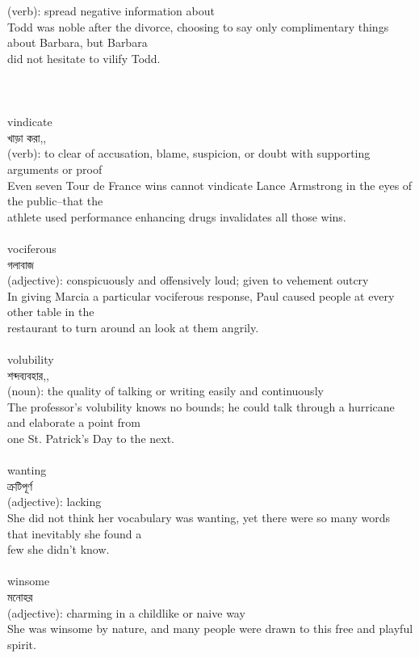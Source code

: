 \documentclass{article}
\begin{document}
{(verb): spread negative information about\\Todd was noble after the divorce, choosing to say only complimentary things about Barbara, but Barbara\\did not hesitate to vilify Todd.\\\\                                                                             \\}\\
{vindicate}\\
{খাড়া করা,,}\\
{(verb): to clear of accusation, blame, suspicion, or doubt with supporting arguments or proof\\Even seven Tour de France wins cannot vindicate Lance Armstrong in the eyes of the public--that the\\athlete used performance enhancing drugs invalidates all those wins.\\}\\
{vociferous}\\
{গলাবাজ}\\
{(adjective): conspicuously and offensively loud; given to vehement outcry\\In giving Marcia a particular vociferous response, Paul caused people at every other table in the\\restaurant to turn around an look at them angrily.\\}\\
{volubility}\\
{শব্দব্যবহার,,}\\
{(noun): the quality of talking or writing easily and continuously\\The professor's volubility knows no bounds; he could talk through a hurricane and elaborate a point from\\one St. Patrick's Day to the next.\\}\\
{wanting}\\
{ক্রটিপূর্ণ}\\
{(adjective): lacking\\She did not think her vocabulary was wanting, yet there were so many words that inevitably she found a\\few she didn't know.\\}\\
{winsome}\\
{মনোহর}\\
{(adjective): charming in a childlike or naive way\\She was winsome by nature, and many people were drawn to this free and playful spirit.\\\\}\\
\end{document}
